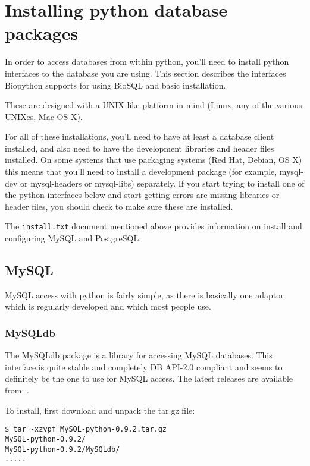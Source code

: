 \documentclass{article}
\begin{document}
\section{Installing python database packages}

In order to access databases from within python, you'll need to install
python interfaces to the database you are using. This section describes
the interfaces Biopython supports for using BioSQL and basic
installation.

These are designed with a UNIX-like platform in mind (Linux, any of the
various UNIXes, Mac OS X).

For all of these installations, you'll need to have at least a database
client installed, and also need to have the development libraries and
header files installed. On some systems that use packaging systems
(Red Hat, Debian, OS X) this means that you'll need to install a
development package (for example, mysql-dev or mysql-headers or 
mysql-libs) separately. If you start trying to install one of the python
interfaces below and start getting errors are missing libraries or
header files, you should check to make sure these are installed.

The \verb|install.txt| document mentioned above provides information on
install and configuring MySQL and PostgreSQL.

\subsection{MySQL}

MySQL access with python is fairly simple, as there is basically one
adaptor which is regularly developed and which most people use.

\subsubsection{MySQLdb}

The MySQLdb package is a library for accessing MySQL databases.
This interface is quite stable and completely DB API-2.0 compliant and
seems to definitely be the one to use for MySQL access. The latest
releases are available from: 
.


To install, first download and unpack the tar.gz file:

\begin{verbatim}
$ tar -xzvpf MySQL-python-0.9.2.tar.gz 
MySQL-python-0.9.2/
MySQL-python-0.9.2/MySQLdb/
.....
\end{verbatim}
\end{document}
